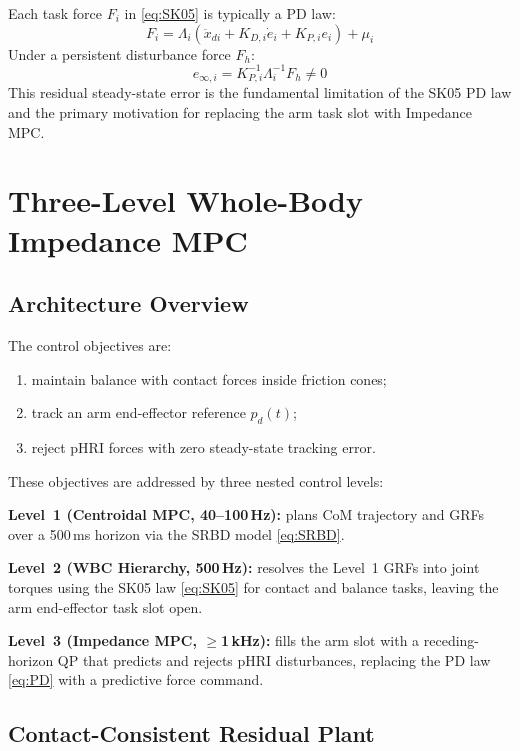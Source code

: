 Each task force $F_i$ in \eqref{eq:SK05} is typically a PD law:
\begin{equation}\label{eq:PD}
  F_i = \Lambda_i(\ddot{x}_{di}+K_{D,i}\dot{e}_i+K_{P,i}e_i)+\mu_i
\end{equation}
Under a persistent disturbance force $F_h$:
\begin{equation}\label{eq:sse}
  e_{\infty,i} = K_{P,i}^{-1}\Lambda_i^{-1}F_h \neq 0
\end{equation}
This residual steady-state error is the fundamental limitation of the SK05
PD law and the primary motivation for replacing the arm task slot with
Impedance MPC.

\section{Three-Level Whole-Body Impedance MPC}\label{sec:impedancempc}

\subsection{Architecture Overview}

The control objectives are:
\begin{enumerate}
  \item maintain balance with contact forces inside friction cones;
  \item track an arm end-effector reference $p_d(t)$;
  \item reject pHRI forces with zero steady-state tracking error.
\end{enumerate}

These objectives are addressed by three nested control levels:

\textbf{Level~1 (Centroidal MPC, 40--100\,Hz):} plans CoM trajectory and
GRFs over a 500\,ms horizon via the SRBD model \eqref{eq:SRBD}.

\textbf{Level~2 (WBC Hierarchy, 500\,Hz):} resolves the Level~1 GRFs into
joint torques using the SK05 law \eqref{eq:SK05} for contact and balance
tasks, leaving the arm end-effector task slot open.

\textbf{Level~3 (Impedance MPC, $\geq$1\,kHz):} fills the arm slot with a
receding-horizon QP that predicts and rejects pHRI disturbances, replacing
the PD law \eqref{eq:PD} with a predictive force command.

\subsection{Contact-Consistent Residual Plant}

